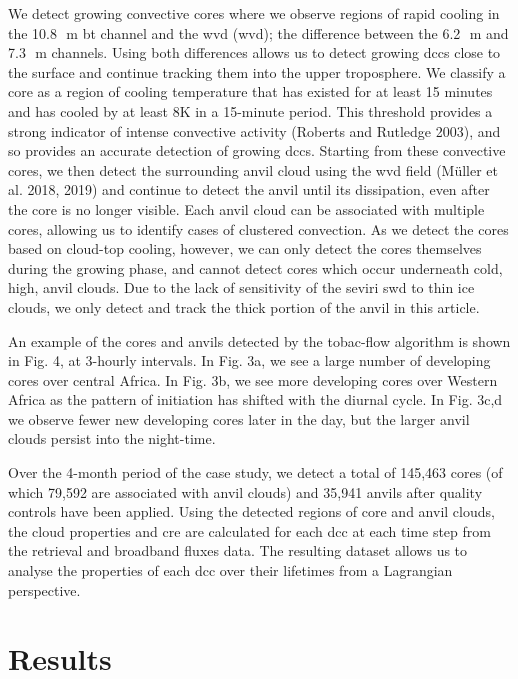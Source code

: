 We detect growing convective cores where we observe regions of rapid
cooling in the 10.8\,\unit{\mu m} \acrshort{bt} channel and the \acrshort{wvd} (\acrshort{wvd});
the difference between the 6.2\,\unit{\mu m} and 7.3\,\unit{\mu m} channels. Using both
differences allows us to detect growing \acrshort{dcc}s close to the surface and
continue tracking them into the upper troposphere. We classify a core as
a region of cooling temperature that has existed for at least 15 minutes
and has cooled by at least 8K in a 15-minute period. This threshold
provides a strong indicator of intense convective activity (Roberts and
Rutledge 2003), and so provides an accurate detection of growing \acrshort{dcc}s.
Starting from these convective cores, we then detect the surrounding
anvil cloud using the \acrshort{wvd} field (Müller et al. 2018, 2019) and continue
to detect the anvil until its dissipation, even after the core is no
longer visible. Each anvil cloud can be associated with multiple cores,
allowing us to identify cases of clustered convection. As we detect the
cores based on cloud-top cooling, however, we can only detect the cores
themselves during the growing phase, and cannot detect cores which occur
underneath cold, high, anvil clouds. Due to the lack of sensitivity of
the \acrshort{seviri} \acrshort{swd} to thin ice clouds, we only detect and track the thick
portion of the anvil in this article.

An example of the cores and anvils detected by the tobac-flow algorithm
is shown in Fig. 4, at 3-hourly intervals. In Fig. 3a, we see a large
number of developing cores over central Africa. In Fig. 3b, we see more
developing cores over Western Africa as the pattern of initiation has
shifted with the diurnal cycle. In Fig. 3c,d we observe fewer new
developing cores later in the day, but the larger anvil clouds persist
into the night-time.

Over the 4-month period of the case study, we detect a total of 145,463
cores (of which 79,592 are associated with anvil clouds) and 35,941
anvils after quality controls have been applied. Using the detected
regions of core and anvil clouds, the cloud properties and \acrshort{cre} are
calculated for each \acrshort{dcc} at each time step from the retrieval and
broadband fluxes data. The resulting dataset allows us to analyse the
properties of each \acrshort{dcc} over their lifetimes from a Lagrangian
perspective.

\section{Results}

